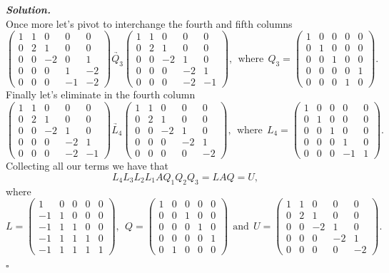 \documentclass[12pt]{report}
\newenvironment{solution}[1][\it{Solution}]{\textbf{#1. } }{$\square$}
\begin{document}
\begin{solution}
\[    \]
    Once more let's pivot to interchange the fourth and fifth columns
    \[ 
        \begin{pmatrix}1&1&0&0&0\\ 0&2&1&0&0\\ 0&0&-2&0&1\\ 0&0&0&1&-2\\ 0&0&0&-1&-2\end{pmatrix} \underrightarrow{Q_3} \begin{pmatrix}1&1&0&0&0\\ 0&2&1&0&0\\ 0&0&-2&1&0\\ 0&0&0&-2&1\\ 0&0&0&-2&-1\end{pmatrix}, ~~ \text{where}~~ Q_3 = \begin{pmatrix}1&0&0&0&0\\ 0&1&0&0&0\\ 0&0&1&0&0\\ 0&0&0&0&1\\ 0&0&0&1&0\end{pmatrix}.
    \]
    Finally let's eliminate in the fourth column
    \[ 
        \begin{pmatrix}1&1&0&0&0\\ 0&2&1&0&0\\ 0&0&-2&1&0\\ 0&0&0&-2&1\\ 0&0&0&-2&-1\end{pmatrix} \underrightarrow{L_4} \begin{pmatrix}1&1&0&0&0\\ 0&2&1&0&0\\ 0&0&-2&1&0\\ 0&0&0&-2&1\\ 0&0&0&0&-2\end{pmatrix}, ~~ \text{where}~~ L_4 = \begin{pmatrix}1&0&0&0&0\\ 0&1&0&0&0\\ 0&0&1&0&0\\ 0&0&0&1&0\\ 0&0&0&-1&1\end{pmatrix}.
    \]
    Collecting all our terms we have that
    \[ L_4L_3L_2L_1AQ_1Q_2Q_3 = LAQ = U,\]
    where
    \[L = \begin{pmatrix}1&0&0&0&0\\ -1&1&0&0&0\\ -1&1&1&0&0\\ -1&1&1&1&0\\ -1&1&1&1&1\end{pmatrix}, ~~ Q = \begin{pmatrix}1&0&0&0&0\\ 0&0&1&0&0\\ 0&0&0&1&0\\ 0&0&0&0&1\\ 0&1&0&0&0\end{pmatrix} ~~ \text{and} ~~ U = \begin{pmatrix}1&1&0&0&0\\ 0&2&1&0&0\\ 0&0&-2&1&0\\ 0&0&0&-2&1\\ 0&0&0&0&-2\end{pmatrix}.\] 

\end{solution}
\end{document}
